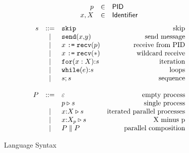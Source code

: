 \begin{figure}[h!]
\[
\begin{array}{rclr}
p & \in &\mathsf{PID}\\
x,X & \in &\mathsf{Identifier}\\
\end{array}
\]
\[
\begin{array}{rclr}
  s & ::=  & \mathtt{skip} & \text{skip} \\
    & \;|\; & \mathtt{send(}x\mathtt{,}y\mathtt{)} & \text{send message} \\
    & \;|\; & x \mathrel{\texttt{:=}} \mathtt{recv(}p\mathtt{)} & \text{receive from PID} \\
    & \;|\; & x \mathrel{\texttt{:=}} \mathtt{recv(}\mathtt{*}\mathtt{)} & \text{wildcard receive} \\
    & \;|\; & \mathtt{for(}x:X\mathtt{)}\mathtt{:} s & \text{iteration} \\
    & \;|\; & \mathtt{while(}e\mathtt{)}\mathtt{:} s & \text{loops} \\
    & \;|\; & s;s & \text{sequence} \\
    \\ 
  P & ::=  & \varepsilon  & \text{empty process} \\
    &      & p \triangleright s & \text{single process} \\
    & \;|\; & x{:}{X} \triangleright s & \text{iterated parallel processes}\\
    & \;|\; & x{:}{{X}_{p}} \triangleright s & \text{X minus p} \\
    & \;|\; & P \mathrel{\|} P & \text{parallel composition}
\end{array}
\]
\caption{Language Syntax}
\end{figure}
